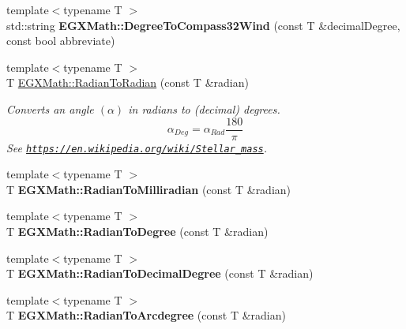 \begin{DoxyCompactItemize}
\item 
\mbox{\label{group___angle_conversions_gaace99e59924f53bcbbc1c12cefee25e7}} 
{\footnotesize template$<$typename T $>$ }\\std\+::string {\bfseries E\+G\+X\+Math\+::\+Degree\+To\+Compass32\+Wind} (const T \&decimal\+Degree, const bool abbreviate)
\item 
{\footnotesize template$<$typename T $>$ }\\T \mbox{\hyperlink{group___angle_conversions_gae08681bd86b8e7e4325f6c8cb3a0dc37}{E\+G\+X\+Math\+::\+Radian\+To\+Radian}} (const T \&radian)
\begin{DoxyCompactList}\small\item\em Converts an angle $(\alpha)$ in radians to (decimal) degrees. \[\alpha_{Deg}=\alpha_{Rad}\frac{180}{\pi}\] See \href{https://en.wikipedia.org/wiki/Stellar_mass}{\tt https\+://en.\+wikipedia.\+org/wiki/\+Stellar\+\_\+mass}. \end{DoxyCompactList}\item 
\mbox{\label{group___angle_conversions_gaea391f0cca39b05e298dd1cae162e7f1}} 
{\footnotesize template$<$typename T $>$ }\\T {\bfseries E\+G\+X\+Math\+::\+Radian\+To\+Milliradian} (const T \&radian)
\item 
\mbox{\label{group___angle_conversions_ga25bbce6cdc1c3621f2a158d320e3bc45}} 
{\footnotesize template$<$typename T $>$ }\\T {\bfseries E\+G\+X\+Math\+::\+Radian\+To\+Degree} (const T \&radian)
\item 
\mbox{\label{group___angle_conversions_ga6d170f1882c32de53167c04524d05f67}} 
{\footnotesize template$<$typename T $>$ }\\T {\bfseries E\+G\+X\+Math\+::\+Radian\+To\+Decimal\+Degree} (const T \&radian)
\item 
\mbox{\label{group___angle_conversions_ga3dfdc97357cc07f8379976bbc08f9852}} 
{\footnotesize template$<$typename T $>$ }\\T {\bfseries E\+G\+X\+Math\+::\+Radian\+To\+Arcdegree} (const T \&radian)
\item 
\mbox{\label{group___angle_conversions_ga722e3b8e78540a6b3942b73b64aeb8d2}} 

\end{DoxyCompactItemize}
